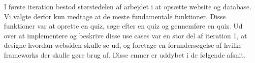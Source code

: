 I første iteration bestod størstedelen af arbejdet i at opsætte website og database. Vi valgte derfor kun medtage at de meste fundamentale funktioner. Disse funktioner var at oprette en quiz, søge efter en quiz og gennemføre en quiz. Ud over at implementere og beskrive disse use cases var en stor del af iteration 1, at designe hvordan websiden skulle se ud, og foretage en forundersøgelse af hvilke frameworks der skulle gøre brug af. Disse emner er uddybet i de følgende afsnit.

















